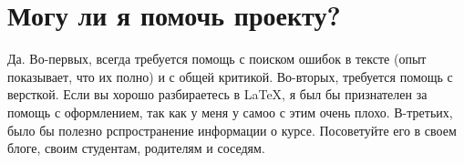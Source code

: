 \section*{Могу ли я помочь проекту?}
Да. Во-первых, всегда требуется помощь с поиском ошибок в тексте (опыт показывает, что их полно) и с общей критикой. Во-вторых, требуется помощь с версткой. Если вы хорошо разбираетесь в \LaTeX, я был бы признателен за помощь с оформлением, так как у меня у самоо с этим очень плохо. В-третьих, было бы полезно рспространение информации о курсе. Посоветуйте его в своем блоге, своим студентам, родителям и соседям.
